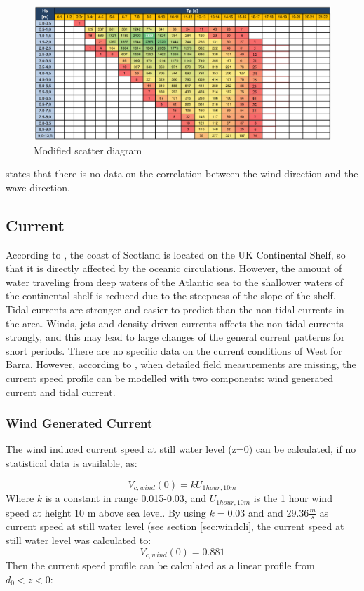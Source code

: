 \begin{figure}[H]
\centering
\includegraphics[scale=0.8]{figures/scatternew}
\caption[$\; \:$Modified scatter diagram ]{Modified scatter diagram  }
 \label{fig:scatn}
\end{figure}
 
 \noindent \cite{Lifes50+D1.1} states that there is no data on the correlation between the wind direction and the wave direction.
 \subsection{Current}
 \label{sec:current}
 According to \cite{Lifes50+D1.1}, the coast of Scotland is located on the UK Continental Shelf, so that it is directly affected by the oceanic circulations. However, the amount of water traveling from deep waters of the Atlantic sea to the shallower waters of the continental shelf is reduced due to the steepness of the slope of the shelf. Tidal currents are stronger and easier to predict than the non-tidal currents in the area. Winds, jets and density-driven currents affects the non-tidal currents strongly, and this may lead to large changes of the general current patterns for short periods. There are no specific data on the current conditions of West for Barra. However, according to \cite{dnvenviroment}, when detailed field measurements are missing, the current speed profile can be modelled with two components: wind generated current and tidal current. \newline
  \newline
  \subsubsection{Wind Generated Current}
  The wind induced current speed at still water level (z=0) can be calculated, if no statistical data is available, as:
  
  \begin{equation}
      V_{c,wind}(0)=k U_{1hour,10m}
  \end{equation}
  Where $k$ is a constant in range 0.015-0.03, and $U_{1hour,10m}$ is the 1 hour wind speed at height 10 m above sea level.\newline
  \newline
  By using $k=0.03$ and and 29.36$\frac{m}{s}$ as current speed at still water level (see section \ref{sec:windcli}, the current speed at still water level was calculated to:\newline
\newline
$$V_{c,wind}(0)=0.881$$   
  Then the current speed profile can be calculated as a linear profile from $d_0 < z < 0$:
  

